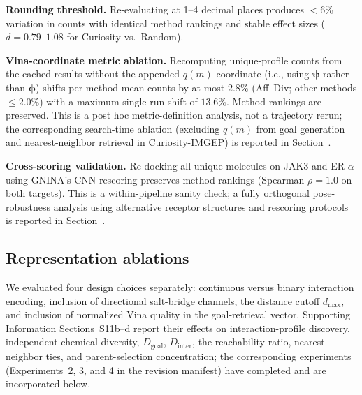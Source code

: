 \documentclass[journal=jcisd8,manuscript=article]{achemso}
\begin{document}
\textbf{Rounding threshold.} Re-evaluating at 1--4 decimal places produces $<$6\% variation in counts with identical method rankings and stable effect sizes ($d = 0.79$--$1.08$ for Curiosity vs.\ Random).

\textbf{Vina-coordinate metric ablation.} Recomputing unique-profile counts from the cached results without the appended $q(m)$ coordinate (i.e., using $\boldsymbol{\psi}$ rather than $\boldsymbol{\phi}$) shifts per-method mean counts by at most $2.8\%$ (Aff--Div; other methods $\leq 2.0\%$) with a maximum single-run shift of $13.6\%$. Method rankings are preserved. This is a post hoc metric-definition analysis, not a trajectory rerun; the corresponding search-time ablation (excluding $q(m)$ from goal generation and nearest-neighbor retrieval in Curiosity-IMGEP) is reported in Section~.

\textbf{Cross-scoring validation.} Re-docking all unique molecules on JAK3 and ER-$\alpha$ using GNINA's CNN rescoring preserves method rankings (Spearman $\rho = 1.0$ on both targets). This is a within-pipeline sanity check; a fully orthogonal pose-robustness analysis using alternative receptor structures and rescoring protocols is reported in Section~.

\subsection{Representation ablations}
\label{sec:ablations}

We evaluated four design choices separately: continuous versus binary interaction encoding, inclusion of directional salt-bridge channels, the distance cutoff $d_{\max}$, and inclusion of normalized Vina quality in the goal-retrieval vector. Supporting Information Sections~S11b--d report their effects on interaction-profile discovery, independent chemical diversity, $D_{\mathrm{goal}}$, $D_{\mathrm{inter}}$, the reachability ratio, nearest-neighbor ties, and parent-selection concentration; the corresponding experiments (Experiments~2, 3, and 4 in the revision manifest) have completed and are incorporated below.
\end{document}
